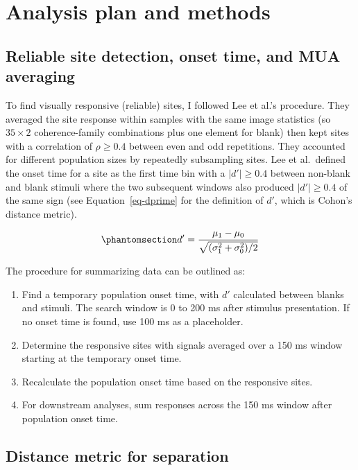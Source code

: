 \documentclass[
  11pt,
  letterpaper,
  DIV=11,
  numbers=noendperiod]{scrartcl}
\providecommand{\tightlist}{%
  \setlength{\itemsep}{0pt}\setlength{\parskip}{0pt}}
\begin{document}
\section{Analysis plan and methods}\label{analysis-plan-and-methods}

\subsection{Reliable site detection, onset time, and MUA
averaging}\label{reliable-site-detection-onset-time-and-mua-averaging}

To find visually responsive (reliable) sites, I followed Lee et al.'s
procedure. They averaged the site response within samples with the same
image statistics (so \(35 \times 2\) coherence-family combinations plus
one element for blank) then kept sites with a correlation of
\(\rho \geq 0.4\) between even and odd repetitions. They accounted for
different population sizes by repeatedly subsampling sites. Lee et
al.~defined the onset time for a site as the first time bin with a
\(|d'| \geq 0.4\) between non-blank and blank stimuli where the two
subsequent windows also produced \(|d'| \geq 0.4\) of the same sign (see
Equation~\ref{eq-dprime} for the definition of \(d'\), which is Cohon's
distance metric).

\begin{equation}\phantomsection\label{eq-dprime}{
d' = \frac{\mu_1 - \mu_0}{\sqrt{(\sigma^2_1 + \sigma^2_0)/2}}
}\end{equation}

The procedure for summarizing data can be outlined as:

\begin{enumerate}
\def\labelenumi{\arabic{enumi}.}
\tightlist
\item
  Find a temporary population onset time, with \(d'\) calculated between
  blanks and stimuli. The search window is 0 to 200 ms after stimulus
  presentation. If no onset time is found, use 100 ms as a placeholder.
\item
  Determine the responsive sites with signals averaged over a 150 ms
  window starting at the temporary onset time.
\item
  Recalculate the population onset time based on the responsive sites.
\item
  For downstream analyses, sum responses across the 150 ms window after
  population onset time.
\end{enumerate}

\subsection{Distance metric for
separation}\label{distance-metric-for-separation}
\end{document}

